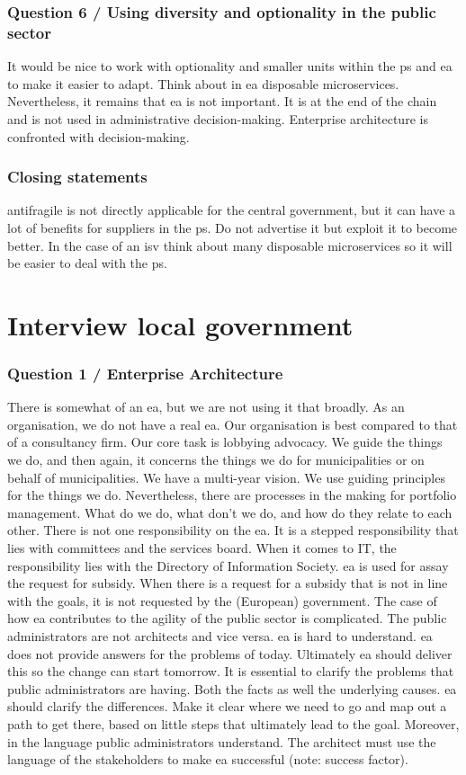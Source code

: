 \subsubsection{Question 6 / Using diversity and optionality in the public sector}
It would be nice to work with optionality and smaller units within the \gls{ps} and \acrshort{ea} to make it easier to adapt. Think about in \acrshort{ea} disposable microservices. Nevertheless, it remains that \acrshort{ea} is not important. It is at the end of the chain and is not used in administrative decision-making. Enterprise architecture is confronted with decision-making.
\subsubsection{Closing statements}
\Gls{antifragile} is not directly applicable for the central government, but it can have a lot of benefits for suppliers in the \gls{ps}. Do not advertise it but exploit it to become better. In the case of an \acrfull{isv} think about many disposable microservices so it will be easier to deal with the \gls{ps}.
\section{Interview local government}
\label{sec:interviewlocalgovernment}
\subsubsection{Question 1 / Enterprise Architecture}
There is somewhat of an \acrshort{ea}, but we are not using it that broadly. As an organisation, we do not have a real \acrshort{ea}. Our organisation is best compared to that of a consultancy firm. Our core task is lobbying advocacy. We guide the things we do, and then again, it concerns the things we do for municipalities or on behalf of municipalities. We have a multi-year vision. We use guiding principles for the things we do.
Nevertheless, there are processes in the making for portfolio management. What do we do, what don't we do, and how do they relate to each other. There is not one responsibility on the \acrshort{ea}. It is a stepped responsibility that lies with committees and the services board. When it comes to IT, the responsibility lies with the Directory of Information Society. \acrshort{ea} is used for assay the request for subsidy. When there is a request for a subsidy that is not in line with the goals, it is not requested by the (European) government.
The case of how \acrshort{ea} contributes to the agility of the public sector is complicated. The public administrators are not architects and vice versa. \acrshort{ea} is hard to understand. \acrshort{ea} does not provide answers for the problems of today. Ultimately \acrshort{ea} should deliver this so the change can start tomorrow. It is essential to clarify the problems that public administrators are having. Both the facts as well the underlying causes. \acrshort{ea} should clarify the differences. Make it clear where we need to go and map out a path to get there, based on little steps that ultimately lead to the goal. Moreover, in the language public administrators understand. The architect must use the language of the stakeholders to make \acrshort{ea} successful (note: success factor).
